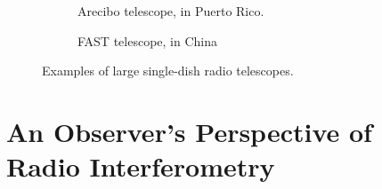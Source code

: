 \begin{figure}[ht]
\centering
\begin{subfigure}{.48\textwidth}
\caption{\label{fig.arecibo} Arecibo telescope, in Puerto Rico.}
\end{subfigure}
\hfill
\begin{subfigure}{.48\textwidth}
\caption{\label{fig.FAST} FAST telescope, in China}
\end{subfigure}
\caption{\label{fig.singleDishes} Examples of large single-dish radio telescopes.}
\end{figure}

\section{An Observer's Perspective of Radio Interferometry}

